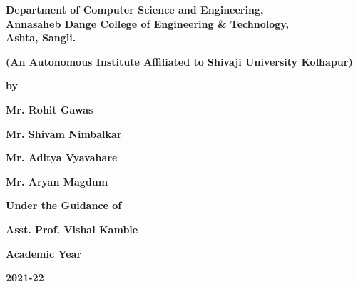 \documentclass[english]{article}
\begin{document}
\vspace{2pt}
\begin{center}
\textbf{\Large Department of Computer Science and Engineering,}\\
\vspace{5pt}
\textbf{ \large Annasaheb Dange College of Engineering \& Technology,}\\
\vspace{8pt}
\textbf{ \large Ashta, Sangli.}
\end{center}{\Large \par}
\begin{center}
\textbf{(An Autonomous Institute Affiliated to Shivaji University Kolhapur)}
\end{center}

\vspace{2pt}

\begin{center}
{\textbf{by}} 
\end{center}

\begin{center}
\textbf{\large Mr. Rohit Gawas}
\end{center}
\begin{center}
\textbf{\large Mr. Shivam Nimbalkar}
\end{center}
\begin{center}
\textbf{\large Mr. Aditya Vyavahare}
\end{center}
\begin{center}
\textbf{\large Mr. Aryan Magdum}
\end{center}

\vspace{10pt}

\begin{center}
{ \textbf{Under the Guidance of}} 
\end{center}

\begin{center}
\textbf{\Large Asst. Prof. Vishal Kamble}
\end{center}

\vspace{25pt}
\begin{center}
{\large \textbf{Academic Year}} 
\end{center}

\begin{center}
\textbf{\Large 2021-22}
\end{center}

\clearpage %
\end{document}
